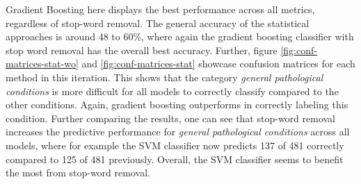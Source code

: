 \setlength{\parindent}{1em}
Gradient Boosting here displays the best performance across all metrics, regardless of stop-word removal. The general accuracy of the statistical approaches is around 48 to 60\%, where again the gradient boosting classifier with stop word removal has the overall best accuracy. Further, figure \ref{fig:conf-matrices-stat-wo} and \ref{fig:conf-matrices-stat} showcase confusion matrices for each method in this iteration. This shows that the category \textit{general pathological conditions} is more difficult for all models to correctly classify compared to the other conditions. Again, gradient boosting outperforms in correctly labeling this condition. Further comparing the results, one can see that stop-word removal increases the predictive performance for \textit{general pathological conditions} across all models, where for example the SVM classifier now predicts 137 of 481 correctly compared to 125 of 481 previously. Overall, the SVM classifier seems to benefit the most from stop-word removal.

